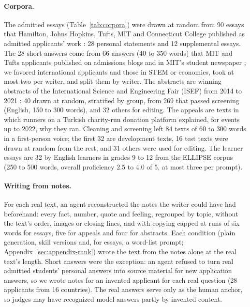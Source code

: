 \documentclass[11pt]{article}
\begin{document}
\paragraph{Corpora.} The admitted essays (Table~\ref{tab:corpora}) were drawn at random from 90 essays that Hamilton, Johns Hopkins, Tufts, MIT and Connecticut College published as admitted applicants' work \citep{hamilton2026essays,jhu2026essays,tufts2026essays,mit2026blogs,conncoll2026essays}: 28 personal statements and 12 supplemental essays. The 28 short answers come from 66 answers (40 to 350 words) that MIT and Tufts applicants published on admissions blogs \citep{mit2026blogs,tufts2026essays} and in MIT's student newspaper \citep{thetech2016essays}; we favored international applicants and those in STEM or economics, took at most two per writer, and split them by writer. The abstracts are winning abstracts of the International Science and Engineering Fair (ISEF) from 2014 to 2021 \citep{sfs2026isef}: 40 drawn at random, stratified by group, from 269 that passed screening (English, 150 to 300 words), and 32 others for editing. The appeals are texts in which runners on a Turkish charity-run donation platform explained, for events up to 2022, why they ran. Cleaning and screening left 84 texts of 60 to 300 words in a first-person voice; the first 32 are development texts, 16 test texts were drawn at random from the rest, and 31 others were used for editing. The learner essays are 32 by English learners in grades 9 to 12 from the ELLIPSE corpus \citep{crossley2023ellipse} (250 to 500 words, overall proficiency 2.5 to 4.0 of 5, at most three per prompt).

\paragraph{Writing from notes.} For each real text, an agent reconstructed the notes the writer could have had beforehand: every fact, number, quote and feeling, regrouped by topic, without the text's order, images or closing lines, and with copying capped at runs of six words for essays, five for appeals and four for abstracts. Each condition (plain generation, skill versions and, for essays, a word-list prompt; Appendix~\ref{sec:appendix-rank}) wrote the text from the notes alone at the real text's length. Short answers were the exception: an agent refused to turn real admitted students' personal answers into source material for new application answers, so we wrote notes for an invented applicant for each real question (28 applicants from 16 countries). The real answers serve only as the human anchor, so judges may have recognized model answers partly by invented content.
\end{document}
